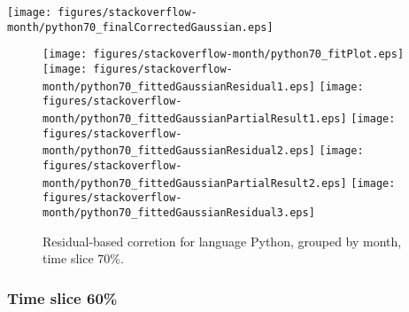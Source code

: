 \begin{center}
{\texttt{[image: figures/stackoverflow-month/python70\_finalCorrectedGaussian.eps]}}
\end{center}

\FloatBarrier

\begin{figure}[t]
\centering
{}
{\texttt{[image: figures/stackoverflow-month/python70\_fitPlot.eps]}}
{\texttt{[image: figures/stackoverflow-month/python70\_fittedGaussianResidual1.eps]}}
{\texttt{[image: figures/stackoverflow-month/python70\_fittedGaussianPartialResult1.eps]}}
{\texttt{[image: figures/stackoverflow-month/python70\_fittedGaussianResidual2.eps]}}
{\texttt{[image: figures/stackoverflow-month/python70\_fittedGaussianPartialResult2.eps]}}
{\texttt{[image: figures/stackoverflow-month/python70\_fittedGaussianResidual3.eps]}}
\caption{Residual-based corretion for language Python, grouped by month, time slice 70\%.}
\end{figure}


\FloatBarrier


\subsubsection{Time slice 60\%}

